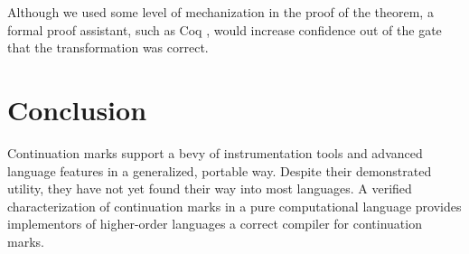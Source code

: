 \documentclass{llncs}
\begin{document}
Although we used some level of mechanization in the proof of the theorem, a formal proof assistant, such as Coq \cite{barras1997coq}, would increase confidence out of the gate that the transformation was correct.

\section{Conclusion}

Continuation marks support a bevy of instrumentation tools and advanced language features in a generalized, portable way. Despite their demonstrated utility, they have not yet found their way into most languages. A verified characterization of continuation marks in a pure computational language provides implementors of higher-order languages a correct compiler for continuation marks.



\end{document}
